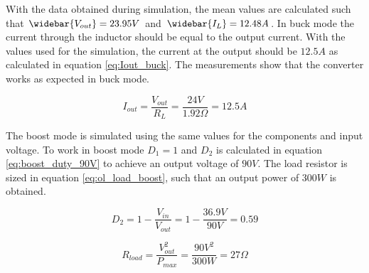 With the data obtained during simulation, the mean values are calculated such that $\widebar{V_{out}} = 23.95V$ and $\widebar{I_L} = 12.48A$. In buck mode the current through the inductor should be equal to the output current. With the values used for the simulation, the current at the output should be $12.5A$ as calculated in equation \ref{eq:Iout_buck}. The measurements show that the converter works as expected in buck mode.

\begin{equation} \label{eq:Iout_buck}
I_{out} = \frac{V_{out}}{R_{L}} = \frac{24V}{1.92\Omega} = 12.5A
\end{equation} 
  

The boost mode is simulated using the same values for the components and input voltage. To work in boost mode $D_1 = 1$ and $D_2$ is calculated in equation \ref{eq:boost_duty_90V} to achieve an output voltage of $90V$. The load resistor is sized in equation \ref{eq:ol_load_boost}, such that an output power of $300W$ is obtained.

\begin{equation} \label{eq:boost_duty_90V}
	D_2 = 1-\frac{V_{in}}{V_{out}} = 1 - \frac{36.9V}{90V} = 0.59
\end{equation}

\begin{equation} \label{eq:ol_load_boost}
	R_{load} = \frac{V_{out}^2}{P_{max}} = \frac{90V^2}{300W} = 27 \Omega
\end{equation}

